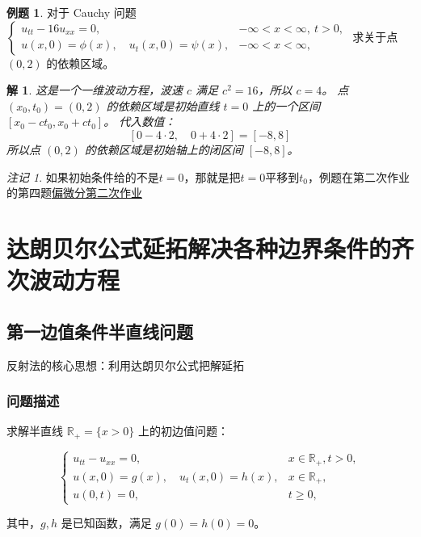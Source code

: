 \documentclass[12pt,a4paper]{article}
\numberwithin{subsection}{section}
\numberwithin{subsubsection}{subsection}
\theoremstyle{plain}
\newtheorem{solution}{解}[subsection]
\theoremstyle{definition}
\newtheorem{example}{例题}[subsection]
\theoremstyle{remark}
\newtheorem{remark}[theorem]{注记}
\begin{document}
		\begin{example}
		对于 Cauchy 问题
		$
		\begin{cases}
			u_{tt} - 16u_{xx} = 0, & -\infty < x < \infty, \ t > 0, \\
			u(x, 0) = \phi(x), \quad u_t(x, 0) = \psi(x), & -\infty < x < \infty,
		\end{cases}
		$
		求关于点 $(0,2)$ 的依赖区域。
	\end{example}
	\begin{solution}
		这是一个一维波动方程，波速 $c$ 满足 $c^2=16$，所以 $c=4$。
		点 $(x_0, t_0) = (0, 2)$ 的依赖区域是初始直线 $t=0$ 上的一个区间 $[x_0 - ct_0, x_0 + ct_0]$。
		代入数值：
		\[
		[0 - 4 \cdot 2, \quad 0 + 4 \cdot 2] = [-8, 8]
		\]
		所以点 $(0,2)$ 的依赖区域是初始轴上的闭区间 $[-8, 8]$。
	\end{solution}
	
	\begin{remark}
	如果初始条件给的不是$t=0$，那就是把$t=0$平移到$t_0$，例题在第二次作业的第四题\href{https://github.com/Albert-Chen04/Partial-differential-equation}{偏微分第二次作业}
	\end{remark}
	
	
	\newpage
	
	\section{达朗贝尔公式延拓解决各种边界条件的齐次波动方程}
	\subsection{第一边值条件半直线问题}
	反射法的核心思想：利用达朗贝尔公式把解延拓
	
	\subsubsection{问题描述}
	求解半直线 \(\mathbb{R}_+ = \{x > 0\}\) 上的初边值问题：
	
	\begin{equation}
		\begin{cases}
			u_{tt} - u_{xx} = 0, & x \in \mathbb{R}_+, t > 0, \\
			u(x, 0) = g(x), \quad u_t(x, 0) = h(x), & x \in \mathbb{R}_+, \\
			u(0, t) = 0, & t \geq 0,
		\end{cases}
	\end{equation}
	
	其中，\(g, h\) 是已知函数，满足 \(g(0) = h(0) = 0\)。
	
\end{document}
